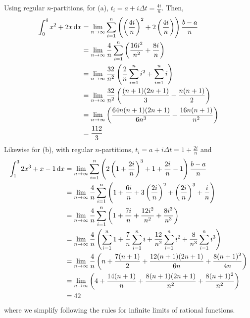 \documentclass{agony}
\begin{document}
\begin{sol}
  Using regular $n$-partitions, for (a), $t_i = a + i\Delta t = \frac{4i}{n}$. Then,
  \begin{align*}
    \int_0^4 x^2 + 2x \dd{x}
     & = \lim_{n\to\infty} \sum_{i=1}^n \left(\left(\frac{4i}{n}\right)^2 + 2\left(\frac{4i}{n}\right)\right) \frac{b-a}{n} \\
     & = \lim_{n\to\infty} \frac{4}{n} \sum_{i=1}^n \left(\frac{16i^2}{n^2} + \frac{8i}{n}\right)                           \\
     & = \lim_{n\to\infty} \frac{32}{n^2} \left( \frac{2}{n} \sum_{i=1}^n i^2 + \sum_{i=1}^n i \right)                      \\
     & = \lim_{n\to\infty} \frac{32}{n^2} \left( \frac{(n+1)(2n+1)}{3} + \frac{n(n+1)}{2} \right)                           \\
     & = \lim_{n\to\infty} \left(\frac{64n(n+1)(2n+1)}{6n^3} + \frac{16n(n+1)}{n^2}\right)                                  \\
     & = \frac{112}{3}
  \end{align*}
  Likewise for (b), with regular $n$-partitions, $t_i = a+i\Delta t = 1+\frac{2i}{n}$ and
  \begin{align*}
    \int_1^3 2x^3 + x - 1 \dd{x}
     & = \lim_{n\to\infty} \sum_{i=1}^n \left( 2\left(1+\frac{2i}{n}\right)^3 + 1 + \frac{2i}{n} - 1 \right)\frac{b-a}{n}                                            \\
     & = \lim_{n\to\infty} \frac{4}{n} \sum_{i=1}^n \left( 1 + \frac{6i}{n} + 3\left(\frac{2i}{n}\right)^2 + \left(\frac{2i}{n}\right)^3 + \frac{i}{n} \right)       \\
     & = \lim_{n\to\infty} \frac{4}{n} \sum_{i=1}^n \left( 1 + \frac{7i}{n} + \frac{12i^2}{n^2} + \frac{8i^3}{n^3} \right)                                           \\
     & = \lim_{n\to\infty} \frac{4}{n} \left( \sum_{i=1}^n 1 + \frac{7}{n} \sum_{i=1}^n i + \frac{12}{n^2} \sum_{i=1}^n i^2 + \frac{8}{n^3} \sum_{i=1}^n i^3 \right) \\
     & = \lim_{n\to\infty} \frac{4}{n} \left( n + \frac{7(n+1)}{2} + \frac{12(n+1)(2n+1)}{6n} + \frac{8(n+1)^2}{4n} \right)                                          \\
     & = \lim_{n\to\infty} \left( 4 + \frac{14(n+1)}{n} + \frac{8(n+1)(2n+1)}{n^2} + \frac{8(n+1)^2}{n^2} \right)                                                    \\
     & = 42
  \end{align*}
  where we simplify following the rules for infinite limits of rational functions.
\end{sol}
\end{document}

